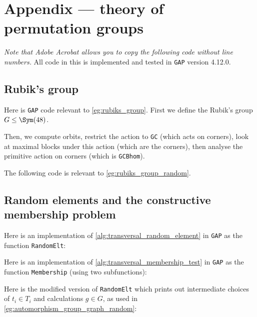 \chapter{Appendix --- theory of permutation groups}%

\textit{Note that Adobe Acrobat allows you to copy the following code without line numbers.} All code in this \thesis{} is implemented and tested in \texttt{GAP} version 4.12.0.

\section{Rubik's group}

Here is \texttt{GAP} code relevant to \autoref{eg:rubiks_group}. First we define the Rubik's group $G \leq \Sym(48)$.\label{app:rubiks_group}



Then, we compute orbits, restrict the action to \texttt{GC} (which acts on corners), look at maximal blocks under this action (which are the corners), then analyse the primitive action on corners (which is \texttt{GCBhom}).



The following code is relevant to \autoref{eg:rubiks_group_random}.



\section{Random elements and the constructive membership problem}

Here is an implementation of \autoref{alg:transversal_random_element} in \texttt{GAP} as the function \texttt{RandomElt}:\label{app:transversal_random_element}



Here is an implementation of \autoref{alg:transversal_membership_test} in \texttt{GAP} as the function \texttt{Membership} (using two subfunctions):\label{app:transversal_membership_test}



Here is the modified version of \texttt{RandomElt} which prints out intermediate choices of $t_i \in T_i$ and calculations $g \in G$, as used in \autoref{eg:automorphism_group_graph_random}:

